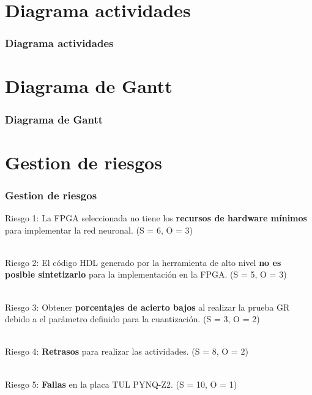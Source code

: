\documentclass{beamer}
\begin{document}
\section{Diagrama actividades}

\begin{frame}[allowframebreaks,c]

\frametitle{Diagrama actividades}

\vspace{0.5cm}


\end{frame}
\section{Diagrama de Gantt}

\begin{frame}[allowframebreaks,c]

\frametitle{Diagrama de Gantt}



\end{frame}
\section{Gestion de riesgos}

\begin{frame}[allowframebreaks,t]

\frametitle{Gestion de riesgos}

\justifying


Riesgo 1: La FPGA seleccionada no tiene los \textbf{recursos de hardware mínimos} para implementar la red neuronal. (S = 6, O = 3) \\\

Riesgo 2: El código HDL generado por la herramienta de alto nivel \textbf{no es posible sintetizarlo} para la implementación en la FPGA. (S = 5, O = 3) \\\

Riesgo 3: Obtener \textbf{porcentajes de acierto bajos} al realizar la prueba GR debido a el parámetro definido para  la cuantización. (S = 3, O = 2) \\\

Riesgo 4: \textbf{Retrasos} para realizar las actividades. (S = 8, O = 2) \\\

Riesgo 5: \textbf{Fallas} en la placa TUL PYNQ-Z2. (S = 10, O = 1)


\end{frame}
\end{document}
